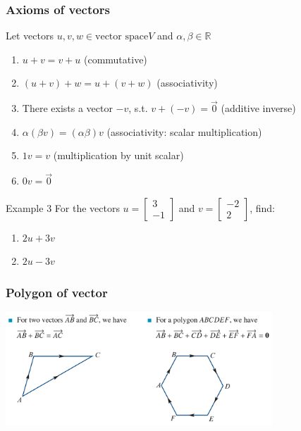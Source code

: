 \documentclass[
	11pt, %
]{beamer}
\newcommand{\blank}{\begin{frame}\end{frame}}
\begin{document}
\begin{frame}
    \frametitle{Axioms of vectors}
    Let vectors $u, v, w \in \text{vector space} V$ and $\alpha, \beta \in \mathbb{R}$
    \begin{enumerate}
        \item $u + v = v + u$ (commutative)
        \item $(u + v) + w = u + (v + w)$ (associativity)
        \item There exists a vector $-v$, s.t. $v + (-v) = \vec{0}$ (additive inverse)
        \item $\alpha(\beta v) = (\alpha \beta)v$ (associativity: scalar multiplication)
        \item $1v = v$ (multiplication by unit scalar)
        \item $0v = \vec{0}$
    \end{enumerate}
    \begin{block}{Example 3}
        For the vectors $u = \begin{bmatrix}
            3 \\ -1
        \end{bmatrix}$ and $v = \begin{bmatrix}
            -2 \\ 2
        \end{bmatrix}$, find:
        \begin{enumerate}
            \item $2u + 3v$
            \item $2u - 3v$
        \end{enumerate}
    \end{block}
\end{frame}

\blank

\begin{frame}
    \frametitle{Polygon of vector}
    \begin{center}
        \includegraphics[width = 10cm]{Polygon.png}
    \end{center}
\end{frame}
\end{document}
